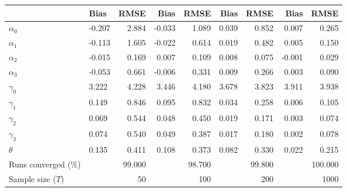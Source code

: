 
\begin{tabular}[t]{llrrrrrrr}
\toprule
  & Bias & RMSE & Bias & RMSE & Bias & RMSE & Bias & RMSE\\
\midrule
$\alpha_{0}$ & -0.207 & 2.884 & -0.033 & 1.089 & 0.039 & 0.852 & 0.007 & 0.265\\
$\alpha_{1}$ & -0.113 & 1.605 & -0.022 & 0.614 & 0.019 & 0.482 & 0.005 & 0.150\\
$\alpha_{2}$ & -0.015 & 0.169 & 0.007 & 0.109 & 0.008 & 0.075 & -0.001 & 0.029\\
$\alpha_{3}$ & -0.053 & 0.661 & -0.006 & 0.331 & 0.009 & 0.266 & 0.003 & 0.090\\
$\gamma_{0}$ & 3.222 & 4.228 & 3.446 & 4.180 & 3.678 & 3.823 & 3.911 & 3.938\\
$\gamma_{1}$ & 0.149 & 0.846 & 0.095 & 0.832 & 0.034 & 0.258 & 0.006 & 0.105\\
$\gamma_{2}$ & 0.069 & 0.544 & 0.048 & 0.450 & 0.019 & 0.171 & 0.003 & 0.074\\
$\gamma_{3}$ & 0.074 & 0.540 & 0.049 & 0.387 & 0.017 & 0.180 & 0.002 & 0.078\\
$\theta$ & 0.135 & 0.411 & 0.108 & 0.373 & 0.082 & 0.330 & 0.022 & 0.215\\
Runs converged (\%) &  & 99.000 &  & 98.700 &  & 99.800 &  & 100.000\\
Sample size ($T$) &  & 50 &  & 100 &  & 200 &  & 1000\\
\bottomrule
\end{tabular}
